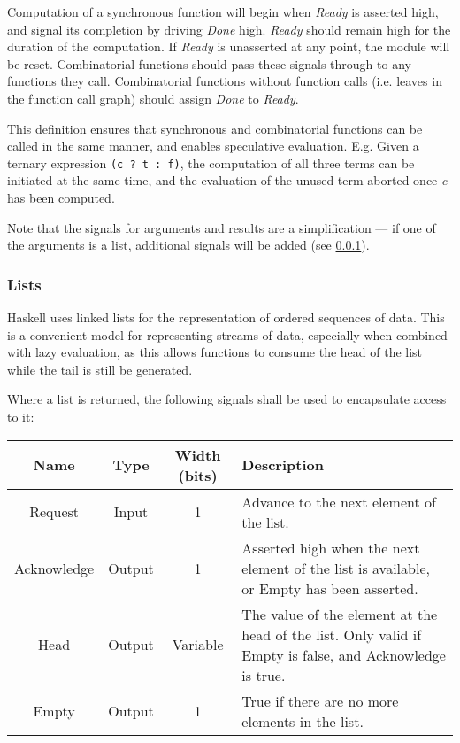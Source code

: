 \documentclass[english,onecolumn]{article}
\begin{document}
Computation of a synchronous function will begin when \textit{Ready} is asserted high, and signal its completion by driving \textit{Done} high. \textit{Ready} should remain high for the duration of the computation. If \textit{Ready} is unasserted at any point, the module will be reset. Combinatorial functions should pass these signals through to any functions they call. Combinatorial functions without function calls (i.e. leaves in the function call graph) should assign \textit{Done} to \textit{Ready}.


This definition ensures that synchronous and combinatorial functions can be called in the same manner, and enables speculative evaluation. E.g. Given a ternary expression \lstinline{(c ? t : f)}, the computation of all three terms can be initiated at the same time, and the evaluation of the unused term aborted once \textit{c} has been computed.

Note that the signals for arguments and results are a simplification --- if one of the arguments is a list, additional signals will be added (see \ref{s:lists}).

\subsubsection{Lists}
\label{s:lists}
Haskell uses linked lists for the representation of ordered sequences of data. This is a convenient model for representing streams of data, especially when combined with lazy evaluation, as this allows functions to consume the head of the list while the tail is still be generated.

Where a list is returned, the following signals shall be used to encapsulate access to it:

\begin{tabularx}{\textwidth}{|c|c|c|X|}
    \hline 
    Name & Type & Width (bits) & Description \\ \hline 
    Request & Input & 1 & Advance to the next element of the list. \\ \hline 
    Acknowledge & Output & 1 & Asserted high when the next element of the list is available, or Empty has been asserted. \\ \hline
    Head & Output & Variable & The value of the element at the head of the list. Only valid if Empty is false, and Acknowledge is true. \\ \hline 
    Empty & Output & 1 & True if there are no more elements in the list. \\ \hline 
\end{tabularx} 
\end{document}
